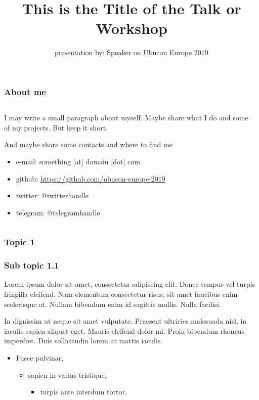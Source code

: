 \documentclass[aspectratio=169]{beamer}
\title{This is the Title of the Talk or Workshop}
\author{presentation by: Speaker on Ubucon Europe 2019}
\begin{document}
\frame[plain]{\titlepage}
 
\begin{frame}
\frametitle{About me}
\begin{columns}[T]
\begin{column}{.5\textwidth}
\begin{block}{I may write a small paragraph about myself. Maybe share what I do and some of my projects. But keep it short.}

And maybe share some contacts and where to find me

\begin{itemize}
\item{} e-mail: something [at] domain [dot] com
\item{} github: \url{https://github.com/ubucon-europe-2019}
\item{} twitter: @twitterhandle
\item{} telegram: @telegramhandle
\end{itemize}
\end{block}
\end{column}
\begin{column}{.5\textwidth}
\begin{center}





\end{center}
\end{column}
\end{columns}
\end{frame}

\begin{frame}
\frametitle{Topic 1}
\end{frame}

\begin{frame}
\frametitle{Sub topic 1.1}

Lorem ipsum dolor sit amet, consectetur adipiscing elit.
Donec tempus vel turpis fringilla eleifend.
Nam elementum consectetur risus, sit amet faucibus enim scelerisque at.
Nullam bibendum enim id sagittis mollis. Nulla facilisi.

In dignissim ut neque sit amet vulputate.
Praesent ultricies malesuada nisl, in iaculis sapien aliquet eget.
Mauris eleifend dolor mi. Proin bibendum rhoncus imperdiet.
Duis sollicitudin lorem at mattis iaculis.

\begin{itemize}
	\item{} Fusce pulvinar,
	\begin{itemize}
		\item{} sapien in varius tristique,
		\begin{itemize}
        		\item{} turpis ante interdum tortor.
		\end{itemize}
	\end{itemize}
\end{itemize}

\end{frame}
\end{document}
